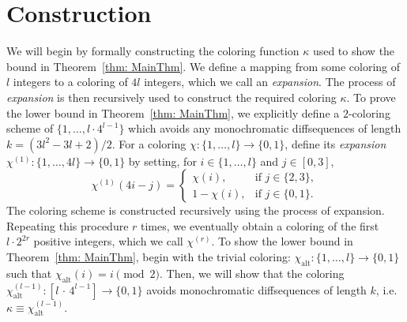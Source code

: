 \documentclass[11pt]{article}
\def\mod{\!\pmod}
\begin{document}

\section{Construction}\label{sec: construction}
We will begin by formally constructing the coloring function $\kappa$ used to show the bound in Theorem~\ref{thm: MainThm}. We define a mapping from some coloring of $l$ integers to a coloring of $4l$ integers, which we call an \textit{expansion}. The process of \textit{expansion} is then recursively used to construct the required coloring $\kappa$. To prove the lower bound in Theorem~\ref{thm: MainThm}, we explicitly define a $2$-coloring scheme of $\{1,\ldots, l \cdot  4^{l-1}\}$ which avoids any monochromatic diffsequences of length $k = (3l^2-3l+2)/2$.  For a coloring $\chi \colon\{1,\ldots, l\} \to \{0,1\}$, define its \textit{expansion} $\chi^{(1)}\colon \{1,\ldots, 4l\} \to \{0,1\}$ by setting, for $i \in \{1, \ldots,  l\}$ and $j \in [0,3]$, 
\begin{equation}
\chi^{(1)}(4i - j) =
\begin{cases}
\chi(i), & \text{if } j \in \{2,3\}, \\
1 - \chi(i), & \text{if } j \in \{0,1\}.
\end{cases}
\end{equation}
The coloring scheme is constructed recursively using the process of expansion. Repeating this procedure $r$ times, we eventually obtain a coloring of the first $l \cdot 2^{2r}$ positive integers, which we call $\chi^{(r)}$. To show the lower bound in Theorem~\ref{thm: MainThm}, begin with the trivial coloring: $\chi_{\mathrm{alt}} \colon \{1,\ldots, l\} \to \{0,1\}$ such that $\chi_{\mathrm{alt}}(i) = i \mod{2}$. Then, we will show that the coloring $\chi_{\mathrm{alt}}^{(l-1)} \colon [ l \, \cdot \, 4^{l-1}] \to \{0,1\}$ avoids monochromatic diffsequences of length $k$, i.e. $\kappa \equiv  \chi_{\mathrm{alt}}^{(l-1)}$. 
\end{document}
